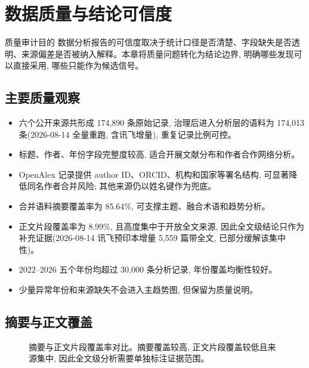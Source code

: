 \section{数据质量与结论可信度}

\begin{reportbox}{质量审计目的}
数据分析报告的可信度取决于统计口径是否清楚、字段缺失是否透明、来源偏差是否被纳入解释。本章将质量问题转化为结论边界, 明确哪些发现可以直接采用, 哪些只能作为候选信号。
\end{reportbox}

\subsection{主要质量观察}

\begin{itemize}
  \item 六个公开来源共形成 174,890 条原始记录, 治理后进入分析层的语料为 174,013 条(2026-08-14 全量重跑, 含讯飞增量), 重复记录比例可控。
  \item 标题、作者、年份字段完整度较高, 适合开展文献分布和作者合作网络分析。
  \item OpenAlex 记录提供 author ID、ORCID、机构和国家等署名结构, 可显著降低同名作者合并风险; 其他来源仍以姓名键作为兜底。
  \item 合并语料摘要覆盖率为 85.64\%, 可支撑主题、融合术语和趋势分析。
  \item 正文片段覆盖率为 8.99\%, 且高度集中于开放全文来源, 因此全文级结论只作为补充证据(2026-08-14 讯飞预印本增量 5{,}559 篇带全文, 已部分缓解该集中性)。
  \item 2022--2026 五个年份均超过 30,000 条分析记录, 年份覆盖均衡性较好。
  \item 少量异常年份和来源缺失不会进入主趋势图, 但保留为质量说明。
\end{itemize}

\subsection{摘要与正文覆盖}

\begin{figure}[!htbp]
  \centering
  \caption{摘要与正文片段覆盖率对比。摘要覆盖较高, 正文片段覆盖较低且来源集中, 因此全文级分析需要单独标注证据范围。}
\end{figure}

